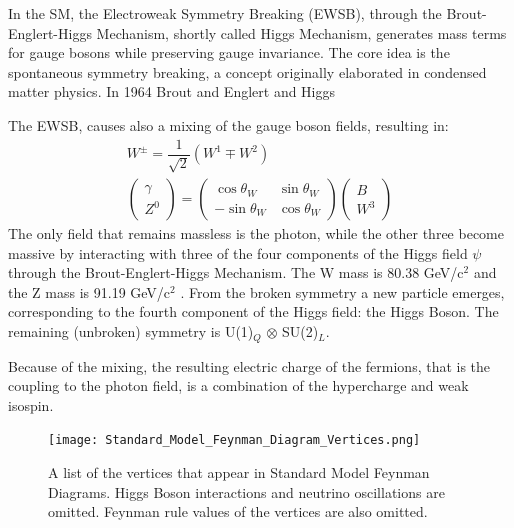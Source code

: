 In the SM, the Electroweak Symmetry Breaking (EWSB), through the Brout-Englert-Higgs Mechanism, shortly called Higgs Mechanism, generates mass terms for gauge bosons while preserving gauge invariance.
The core idea is the spontaneous symmetry breaking, a concept originally elaborated in condensed matter physics.
In 1964 Brout and Englert \cite{PhysRevLett.13.321} and Higgs \cite{PhysRevLett.13.508, HIGGS1964132}

The EWSB, causes also a mixing of the gauge boson fields, resulting in:
\begin{equation}
\begin{split}
  W^\pm = \dfrac{1}{\sqrt{2}} \left( W^1 \mp W^2 \right)
  \\
  \begin{pmatrix} \gamma \\ Z^0 \end{pmatrix} = \begin{pmatrix} \cos\theta_W & \sin\theta_W \\ -\sin\theta_W & \cos\theta_W \end{pmatrix} \begin{pmatrix} B \\ W^3\end{pmatrix}
\end{split}
\end{equation}
The only field that remains massless is the photon, while the other three become massive by interacting with three of the four components of the Higgs field $\psi$ through the Brout-Englert-Higgs Mechanism. The W mass is 80.38 GeV/c$^2$ and the Z mass is 91.19 GeV/c$^2$ \cite{Workman:2022ynf}.
From the broken symmetry a new particle emerges, corresponding to the fourth component of the Higgs field: the Higgs Boson.
The remaining (unbroken) symmetry is U(1)$_Q$ $\otimes$ SU(2)$_L$.

Because of the mixing, the resulting electric charge of the fermions, that is the coupling to the photon field, is a combination of the hypercharge and weak isospin.

\begin{figure}[ht]
\centering
\texttt{[image: Standard\_Model\_Feynman\_Diagram\_Vertices.png]}
\caption{A list of the vertices that appear in Standard Model Feynman Diagrams. Higgs Boson interactions and neutrino oscillations are omitted. Feynman rule values of the vertices are also omitted. \cite{wikipedia_SM_feynman_vertices}}
\label{fig:SM_feynman_vertices}
\end{figure}

